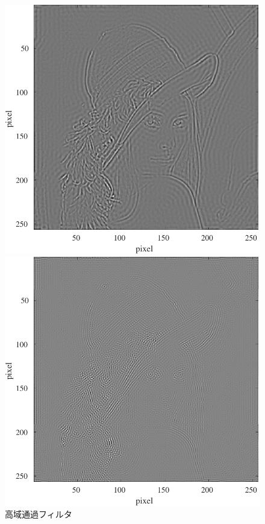 \begin{figure}[H]
\begin{minipage}[b]{.23\textwidth}
    \end{minipage}
    \begin{minipage}[b]{.48\textwidth}
        \centering
        \includegraphics[keepaspectratio,width=\textwidth]{../../Figures/08_44_fft-filter-50.pdf}
    \end{minipage}
    \begin{minipage}[b]{.48\textwidth}
        \centering
        \includegraphics[keepaspectratio,width=\textwidth]{../../Figures/08_45_fft-filter-100.pdf}
    \end{minipage}
    \caption{高域通過フィルタ}
\end{figure}
